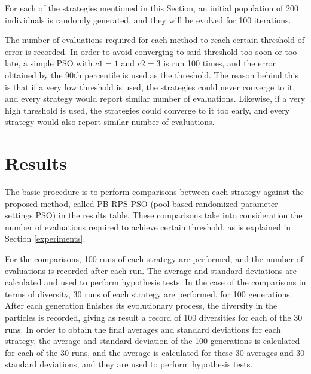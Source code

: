 For each of the strategies mentioned in this Section, an initial population of 200 individuals is randomly generated, and they will be evolved for 100 iterations.%

The number of evaluations required for each method to reach certain threshold of error is recorded. In order to avoid converging to said threshold too soon or too late, a simple PSO with $c1 = 1$ and $c2 = 3$ is run 100 times, and the error obtained by the 90th percentile is used as the threshold. The reason behind this is that if a very low threshold is used, the strategies could never converge to it, and every strategy would report similar number of evaluations. Likewise, if a very high threshold is used, the strategies could converge to it too early, and every strategy would also report similar number of evaluations.


\section{Results}
\label{results}

The basic procedure is to perform comparisons between each strategy against the proposed method, called PB-RPS PSO (pool-based randomized parameter settings PSO) in the results table. These comparisons take into consideration the number of evaluations required to achieve certain threshold, as is explained in Section \ref{experiments}.%

For the comparisons, 100 runs of each strategy are performed, and the number of evaluations is recorded after each run. The average and standard deviations are calculated and used to perform hypothesis tests. In the case of the comparisons in terms of diversity, 30 runs of each strategy are performed, for 100 generations. After each generation finishes its evolutionary process, the diversity in the particles is recorded, giving as result a record of 100 diversities for each of the 30 runs. In order to obtain the final averages and standard deviations for each strategy, the average and standard deviation of the 100 generations is calculated for each of the 30 runs, and the average is calculated for these 30 averages and 30 standard deviations, and they are used to perform hypothesis tests.

